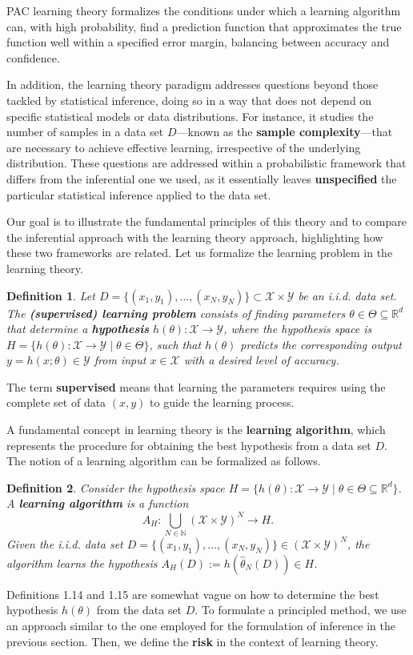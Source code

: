 \documentclass{report}
\newtheorem{definition}{Definition}[chapter]
\begin{document}
PAC learning theory formalizes the conditions under which a learning algorithm can, with high probability, find a prediction function that approximates the true  function well within a specified error margin, balancing between accuracy and confidence.

In addition, the learning theory paradigm addresses questions beyond those tackled by statistical inference, doing so in a way that does not depend on specific statistical models or data distributions. For instance, it studies the number of samples in a data set $D$—known as the \textbf{sample complexity}—that are necessary to achieve effective learning, irrespective of the underlying distribution. These questions are addressed within a probabilistic framework that differs from the inferential one we used, as it essentially leaves \textbf{unspecified} the particular statistical inference applied to the data set.

Our goal is to illustrate the fundamental principles of this theory and to compare the inferential approach with the learning theory approach, highlighting how these two frameworks are related. Let us formalize the learning problem in the learning theory.

\begin{definition}
Let $D = \{(x_1,y_1), \dots, (x_N,y_N)\} \subset \mathcal{X} \times \mathcal{Y}$ be an i.i.d. data set. The \textbf{(supervised) learning problem} consists of finding parameters $\theta \in \Theta \subseteq \mathbb{R}^d$ that determine a \textbf{hypothesis} $h(\theta) : \mathcal{X} \to \mathcal{Y}$, where the hypothesis space is $H = \{h(\theta) : \mathcal{X} \to \mathcal{Y} \mid \theta \in \Theta\}$, such that $h(\theta)$ predicts the corresponding output $y = h(x;\theta) \in \mathcal{Y}$ from input $x \in \mathcal{X}$ with a desired level of accuracy.
\end{definition}
The term \textbf{supervised} means that learning the parameters requires using the complete set of data $(x,y)$ to guide the learning process.

A fundamental concept in learning theory is the \textbf{learning algorithm}, which represents the procedure for obtaining the best hypothesis from a data set $D$. The notion of a learning algorithm can be formalized as follows.

\begin{definition}
Consider the hypothesis space $H = \{h(\theta) : \mathcal{X} \to \mathcal{Y} \mid\theta\in\Theta\subseteq\mathbb{R}^d\}$. A \textbf{learning algorithm} is a function \[A_H : \bigcup_{N \in \mathbb{N}} (\mathcal{X}\times \mathcal{Y}) ^N\to H.\]
Given the  i.i.d. data set $D = \{(x_1,y_1), \dots, (x_N,y_N)\} \in (\mathcal{X} \times \mathcal{Y})^N$, the algorithm learns the hypothesis $A_H(D) := h(\hat{\theta}_N(D)) \in H$.
\end{definition}
Definitions 1.14 and 1.15 are somewhat vague on how to determine the best hypothesis $h(\theta)$ from the data set $D$. To formulate a principled method, we use an approach similar to the one employed for the formulation of inference in the previous section. Then, we define the \textbf{risk} in the context of learning theory.
\end{document}

